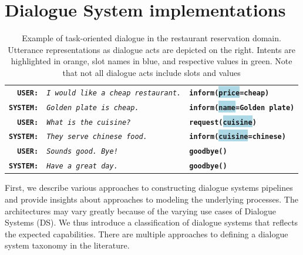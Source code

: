 \section{Dialogue System implementations}
\label{02:ds-background}
\begin{table}[tp]
\small
\setlength\fboxsep{2pt}
        \centering
        \begin{tabular}{rll}
        \textbf{\texttt{USER:}} & \textit{\texttt{I would like a cheap restaurant.}} & \textbf{\texttt{\colorbox{pastelyellow}{inform}(\colorbox{lightblue}{price}=\colorbox{pastelgreen}{cheap})}} \\
        \textbf{\texttt{SYSTEM:}} & \textit{\texttt{Golden plate is cheap.}} & \textbf{\texttt{\colorbox{pastelyellow}{inform}(\colorbox{lightblue}{name}=\colorbox{pastelgreen}{Golden plate})}} \\
        \hdashline[1.5pt/2pt]
        \textbf{\texttt{USER:}} & \textit{\texttt{What is the cuisine?}} & \textbf{\texttt{\colorbox{pastelyellow}{request}(\colorbox{lightblue}{cuisine})}} \\
        \textbf{\texttt{SYSTEM:}} & \textit{\texttt{They serve chinese food.}} & \textbf{\texttt{\colorbox{pastelyellow}{inform}(\colorbox{lightblue}{cuisine}=\colorbox{pastelgreen}{chinese})}} \\
        \hdashline[1.5pt/2pt]
        \textbf{\texttt{USER:}} & \textit{\texttt{Sounds good. Bye!}} & \textbf{\texttt{\colorbox{pastelyellow}{goodbye}()}} \\
        \textbf{\texttt{SYSTEM:}} & \textit{\texttt{Have a great day.}} & \textbf{\texttt{\colorbox{pastelyellow}{goodbye}()}} \\
        \end{tabular}
\normalsize
        \caption{Example of task-oriented dialogue in the restaurant reservation domain. Utterance representations as dialogue acts are depicted on the right. Intents are highlighted in orange, slot names in blue, and respective values in green. Note that not all dialogue acts include slots and values}
    \label{fig:das}
\end{table}
First, we describe various approaches to constructing dialogue systems pipelines and provide insights about approaches to modeling the underlying processes.
The architectures may vary greatly because of the varying use cases of Dialogue Systems (DS).
We thus introduce a classification of dialogue systems that reflects the expected capabilities.
There are multiple approaches to defining a dialogue system taxonomy in the literature.
